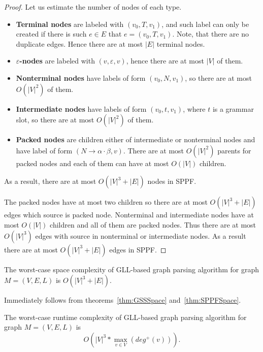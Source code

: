 \begin{proof}
Let us estimate the number of nodes of each type.
\begin{itemize}
\item \textbf{Terminal nodes} are labeled with $(v_0, T, v_1)$, and such label can only be created if there is such $e \in E$ that $e=(v_0, T,v_1)$. 
Note, that there are no duplicate edges. 
Hence there are at most $|E|$ terminal nodes.
\item \textbf{$\varepsilon$-nodes} are labeled with $(v, \varepsilon, v)$, hence there are at most $|V|$ of them. 
\item \textbf{Nonterminal nodes} have labels of form $(v_0, N, v_1)$, so there are at most $O(|V|^2)$ of them.
\item \textbf{Intermediate nodes} have labels of form $(v_0, t, v_1)$, where $t$ is a grammar slot, so there are at most $O(|V|^2)$ of them.
\item \textbf{Packed nodes} are children either of intermediate or nonterminal nodes and have label of form $(N \rightarrow \alpha \cdot \beta, v)$.
There are at most $O(|V|^2)$ parents for packed nodes and each of them can have at most $O(|V|)$ children.
\end{itemize}

As a result, there are at most $O(|V|^3 + |E|)$ nodes in SPPF.

The packed nodes have at most two children so there are at most $O(|V|^3 + |E|)$ edges which source is packed node. 
Nonterminal and intermediate nodes have at most $O(|V|)$ children and all of them are packed nodes.
Thus there are at most $O(|V|^3)$ edges with source in nonterminal or intermediate nodes. As a result there are at most $O(|V|^3 + |E|)$ edges in SPPF.


\end{proof}

\begin{mytheorem}
The worst-case space complexity of GLL-based graph parsing algorithm for graph $M=(V,E,L)$ is $O(|V|^3 + |E|)$.
\end{mytheorem}


Immediately follows from theorems~\ref{thm:GSSSpace} and~\ref{thm:SPPFSpace}. 



\begin{mytheorem}\label{thm:complexity}
The worst-case runtime complexity of GLL-based graph parsing algorithm for graph $M=(V,E,L)$ is $$O\left(|V|^3*\max\limits_{v \in V}\left(deg^+\left(v\right)\right)\right).$$
\end{mytheorem}

